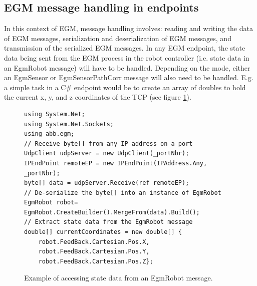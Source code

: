 \documentclass{cslthse-msc}
\begin{document}
\subsection{EGM message handling in endpoints}
\label{sec:EGM:Message_Protos:message_handling}
In this context of EGM, message handling involves: reading and writing the data of EGM messages, serialization and deserialization of EGM messages, and transmission of the serialized EGM messages. In any EGM endpoint, the state data being sent from the EGM process in the robot controller (i.e. state data in an EgmRobot message) will have to be handled. Depending on the mode, either an EgmSensor or EgmSensorPathCorr message will also need to be handled. E.g. a simple task in a C\# endpoint would be to create an array of doubles to hold the current x, y, and z coordinates of the TCP (see figure \ref{fig:parse_egmrobot}). 

\lstset{language=[Sharp]C}
\begin{figure}[H]
    \centering
    \begin{lstlisting}
using System.Net;
using System.Net.Sockets;
using abb.egm;      
// Receive byte[] from any IP address on a port
UdpClient udpServer = new UdpClient(_portNbr);
IPEndPoint remoteEP = new IPEndPoint(IPAddress.Any, _portNbr);
byte[] data = udpServer.Receive(ref remoteEP);
// De-serialize the byte[] into an instance of EgmRobot
EgmRobot robot= EgmRobot.CreateBuilder().MergeFrom(data).Build();
// Extract state data from the EgmRobot message
double[] currentCoordinates = new double[] {
    robot.FeedBack.Cartesian.Pos.X,
    robot.FeedBack.Cartesian.Pos.Y,
    robot.FeedBack.Cartesian.Pos.Z};
\end{lstlisting}
    \caption{Example of accessing state data from an EgmRobot message.}
    \label{fig:parse_egmrobot}
\end{figure}
\end{document}
